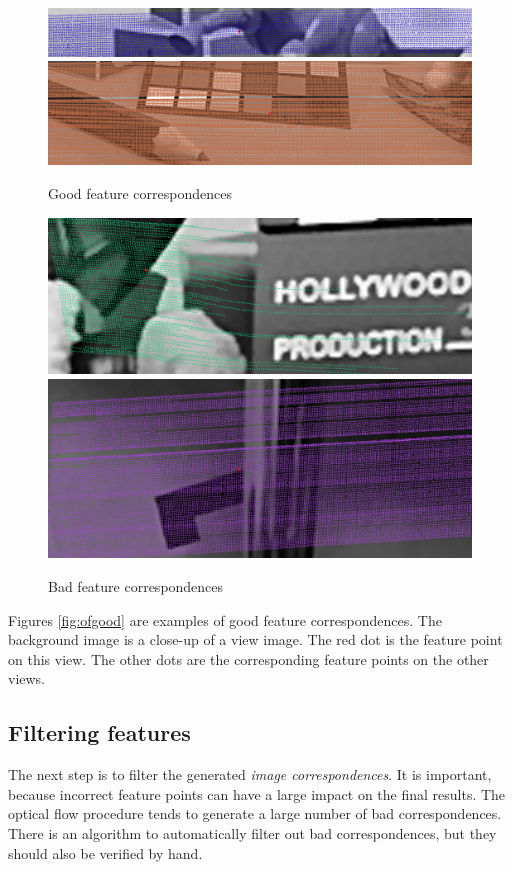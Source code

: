 \documentclass{scrreprt}
\begin{document}
\begin{figure}
\includegraphics[width=\textwidth]{ofgood1.png}
\includegraphics[width=\textwidth]{ofgood2.png}
\caption{Good feature correspondences}
\label{fig:ofgood}

\vspace{1.5cm}

\includegraphics[width=\textwidth]{ofbad2.png}
\includegraphics[width=\textwidth]{ofbad1.png}
\caption{Bad feature correspondences}
\label{fig:ofbad}
\end{figure}

Figures \ref{fig:ofgood} are examples of good feature correspondences. The background image is a close-up of a view image. The red dot is the feature point on this view. The other dots are the corresponding feature points on the other views. 

\subsection{Filtering features}
The next step is to filter the generated \emph{image correspondences}. It is important, because incorrect feature points can have a large impact on the final results. The optical flow procedure tends to generate a large number of bad correspondences. There is an algorithm to automatically filter out bad correspondences, but they should also be verified by hand.
\end{document}
